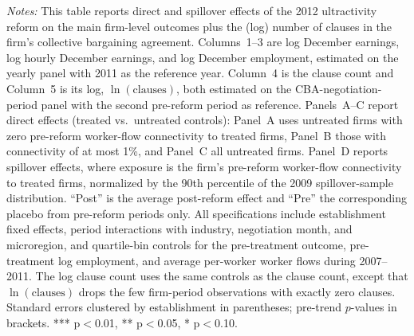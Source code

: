 \begin{table}[!htbp]
\begin{minipage}{\linewidth}
\textit{Notes:} This table reports direct and spillover effects of the 2012 ultractivity reform on the main firm-level outcomes plus the (log) number of clauses in the firm's collective bargaining agreement. Columns~1--3 are log December earnings, log hourly December earnings, and log December employment, estimated on the yearly panel with 2011 as the reference year. Column~4 is the clause count and Column~5 is its log, $\ln(\text{clauses})$, both estimated on the CBA-negotiation-period panel with the second pre-reform period as reference. Panels~A--C report direct effects (treated vs.\ untreated controls): Panel~A uses untreated firms with zero pre-reform worker-flow connectivity to treated firms, Panel~B those with connectivity of at most 1\%, and Panel~C all untreated firms. Panel~D reports spillover effects, where exposure is the firm's pre-reform worker-flow connectivity to treated firms, normalized by the 90th percentile of the 2009 spillover-sample distribution. ``Post'' is the average post-reform effect and ``Pre'' the corresponding placebo from pre-reform periods only. All specifications include establishment fixed effects, period interactions with industry, negotiation month, and microregion, and quartile-bin controls for the pre-treatment outcome, pre-treatment log employment, and average per-worker worker flows during 2007--2011. The log clause count uses the same controls as the clause count, except that $\ln(\text{clauses})$ drops the few firm-period observations with exactly zero clauses. Standard errors clustered by establishment in parentheses; pre-trend $p$-values in brackets. *** p$<$0.01, ** p$<$0.05, * p$<$0.10.
\end{minipage}
\end{table}
